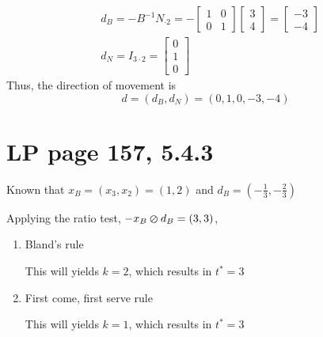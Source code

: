 \documentclass[11pt]{article}
\begin{document}
\begin{enumerate}
    \begin{align*}
    & d_B = -B^{-1}N_{\cdot 2} =-\begin{bmatrix} 1 & 0 \\ 0 & 1\end{bmatrix}\begin{bmatrix} 3 \\ 4 \end{bmatrix} = \begin{bmatrix} -3 \\ -4 \end{bmatrix} \\
    & d_N = I_{3\cdot 2} = \begin{bmatrix} 0 \\ 1 \\ 0 \end{bmatrix}
    \end{align*}
    Thus, the direction of movement is $$d = (d_B, d_N) = (0, 1, 0, -3, -4)$$
\end{enumerate}

\section{LP page 157, 5.4.3}

Known that $x_B=(x_3,x_2) = (1,2)$ and $d_B=(-\frac{1}{3},-\frac{2}{3})$

Applying the ratio test, $-x_B \varoslash d_B = (3, 3)$,

\begin{enumerate}
    \item Bland's rule\par
    This will yields $k=2$, which results in $t^*=3$
    \item First come, first serve rule\par
    This will yields $k=1$, which results in $t^*=3$
\end{enumerate}
\end{document}
